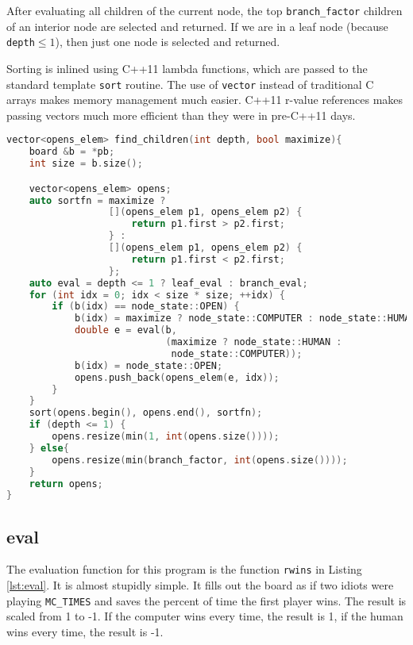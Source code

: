 \documentclass[12pt,titlepage]{amsart}
\begin{document}
After evaluating all children of the current node, the top
\texttt{branch\_factor} children of an interior node are selected and returned.
If we are in a leaf node (because \texttt{depth}$\leq 1$), then just one node is
selected and returned.

Sorting is inlined using C++11 lambda functions, which are passed to the
standard template \texttt{sort} routine. The use of \texttt{vector} instead of
traditional C arrays makes memory management much easier. C++11 r-value
references makes passing vectors much more efficient than they were in pre-C++11
days.

\singlespacing
\begin{lstlisting}[language=C++,float,label={lst:fc},
                   basicstyle=\small,caption=find\_children]
vector<opens_elem> find_children(int depth, bool maximize){
    board &b = *pb;
    int size = b.size();

    vector<opens_elem> opens;
    auto sortfn = maximize ?
                  [](opens_elem p1, opens_elem p2) {
                      return p1.first > p2.first;
                  } :
                  [](opens_elem p1, opens_elem p2) {
                      return p1.first < p2.first;
                  };
    auto eval = depth <= 1 ? leaf_eval : branch_eval;
    for (int idx = 0; idx < size * size; ++idx) {
        if (b(idx) == node_state::OPEN) {
            b(idx) = maximize ? node_state::COMPUTER : node_state::HUMAN;
            double e = eval(b,
                            (maximize ? node_state::HUMAN :
                             node_state::COMPUTER));
            b(idx) = node_state::OPEN;
            opens.push_back(opens_elem(e, idx));
        }
    }
    sort(opens.begin(), opens.end(), sortfn);
    if (depth <= 1) {
        opens.resize(min(1, int(opens.size())));
    } else{
        opens.resize(min(branch_factor, int(opens.size())));
    }
    return opens;
}
\end{lstlisting}
\doublespacing
\subsection{eval}

The evaluation function for this program is the function \texttt{rwins} in
Listing \ref{lst:eval}. It is almost stupidly simple. It fills out the board as
if two idiots were playing \texttt{MC\_TIMES} and saves the percent of time the
first player wins. The result is scaled from 1 to -1. If the computer wins every
time, the result is 1, if the human wins every time, the result is -1.
\end{document}
